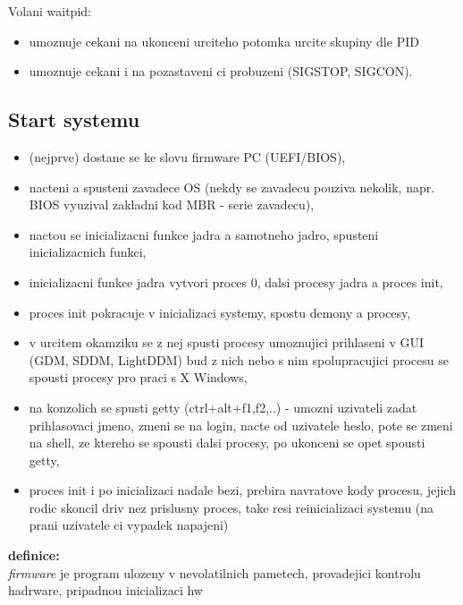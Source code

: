 \documentclass[a4paper, 11pt]{article}
\begin{document}
Volani waitpid:
\begin{itemize}
    \item umoznuje cekani na ukonceni urciteho potomka urcite skupiny dle PID
    \item umoznuje cekani i na pozastaveni ci probuzeni (SIGSTOP, SIGCON). \\
\end{itemize}

\subsection{Start systemu}
\begin{itemize}
    \item (nejprve) dostane se ke slovu firmware PC (UEFI/BIOS),
    \item nacteni a spusteni zavadece OS (nekdy se zavadecu pouziva nekolik, napr. BIOS vyuzival zakladni kod MBR - serie zavadecu),
    \item nactou se inicializacni funkce jadra a samotneho jadro, spusteni inicializacnich funkci,
    \item inicializacni funkce jadra vytvori proces 0, dalsi procesy jadra a proces init,
    \item proces init pokracuje v inicializaci systemy, spostu demony a procesy,
    \item v urcitem okamziku se z nej spusti procesy umoznujici prihlaseni v GUI (GDM, SDDM, LightDDM) bud z nich nebo s nim spolupracujici procesu se spousti procesy pro praci s X Windows,
    \item na konzolich se spusti getty (ctrl+alt+f1,f2,..) - umozni uzivateli zadat prihlasovaci jmeno, zmeni se na login, nacte od uzivatele heslo, pote se zmeni na shell, ze ktereho se spousti dalsi procesy, po ukonceni se opet spousti getty,
    \item proces init i po inicializaci nadale bezi, prebira navratove kody procesu, jejich rodic skoncil driv nez prislusny proces, take resi reinicializaci systemu (na prani uzivatele ci vypadek napajeni) \\
\end{itemize}

\textbf{definice:} \\[0.5em]
\textit{firmware} je program ulozeny v nevolatilnich pametech, provadejici kontrolu hadrware, pripadnou inicializaci hw  \\

\newpage
\end{document}
